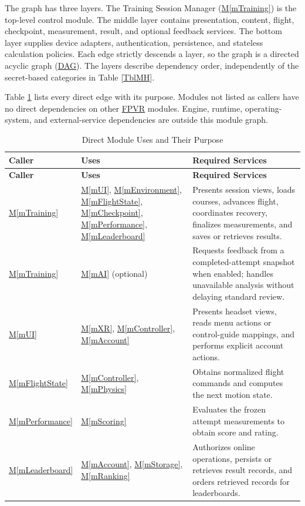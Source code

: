 \documentclass[12pt, titlepage]{article}
\DeclareRobustCommand{\mgabbr}[2]{\hyperlink{mg-abbr:#1}{#2}}
\newcommand{\mref}[1]{\hyperref[#1]{M\ref*{#1}}}
\begin{document}
The graph has three layers. The Training Session Manager
(\mref{mTraining}) is the top-level control module. The middle layer
contains presentation, content, flight, checkpoint, measurement, result,
and optional feedback services. The bottom layer supplies device adapters,
authentication, persistence, and stateless calculation policies. Each edge
strictly descends a layer, so the graph is a directed acyclic graph
(\mgabbr{dag}{DAG}).
The layers describe dependency order, independently of the secret-based
categories in Table \ref{TblMH}.

Table \ref{TblUses} lists every direct edge with its purpose. Modules not
listed as callers have no direct dependencies on other \mgabbr{fpvr}{FPVR}
modules.
Engine, runtime, operating-system, and external-service dependencies are
outside this module graph.

\begin{longtable}{p{} p{} p{}}
\caption{Direct Module Uses and Their Purpose}\label{TblUses}\\
\toprule
\textbf{Caller} & \textbf{Uses} & \textbf{Required Services} \\
\midrule
\endfirsthead
\toprule
\textbf{Caller} & \textbf{Uses} & \textbf{Required Services} \\
\midrule
\endhead
\bottomrule
\endfoot
\mref{mTraining}
& \mref{mUI}, \mref{mEnvironment}, \mref{mFlightState},
  \mref{mCheckpoint}, \mref{mPerformance}, \mref{mLeaderboard}
& Presents session views, loads courses, advances flight, coordinates
  recovery, finalizes measurements, and saves or retrieves results. \\
\mref{mTraining} & \mref{mAI} (optional)
& Requests feedback from a completed-attempt snapshot when enabled;
  handles unavailable analysis without delaying standard review. \\
\mref{mUI} & \mref{mXR}, \mref{mController}, \mref{mAccount}
& Presents headset views, reads menu actions or control-guide mappings,
  and performs explicit account actions. \\
\mref{mFlightState} & \mref{mController}, \mref{mPhysics}
& Obtains normalized flight commands and computes the next motion state. \\
\mref{mPerformance} & \mref{mScoring}
& Evaluates the frozen attempt measurements to obtain score and rating. \\
\mref{mLeaderboard} & \mref{mAccount}, \mref{mStorage}, \mref{mRanking}
& Authorizes online operations, persists or retrieves result records,
  and orders retrieved records for leaderboards. \\
\end{longtable}
\end{document}
